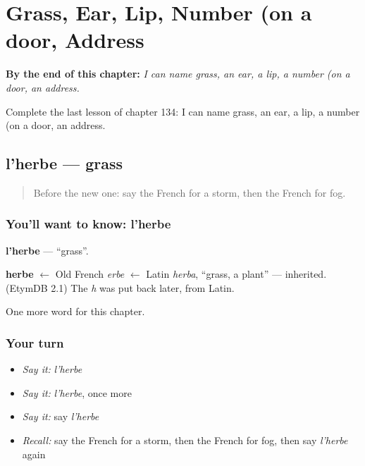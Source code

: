 
\chapter{Grass, Ear, Lip, Number (on a door, Address}
\label{ch:fr-grass-ear-lip-number-on-a-door-address}

\begin{chapteropening}
\textbf{By the end of this chapter:} \emph{I can name grass, an ear, a lip, a number (on a door, an address.}

Complete the last lesson of chapter 134: I can name grass, an ear, a lip, a number (on a door, an address.
\end{chapteropening}

\section[l'herbe]{l'herbe — grass}

\label{lesson:FR-C134-herbe}



\begin{quote}
Before the new one: say the French for a storm, then the French for fog.
\end{quote}

\subsection*{You'll want to know: l'herbe}
\textbf{l'herbe} — \textquotedblleft{}grass\textquotedblright{}.

\begin{cousinweb}
\textbf{herbe} $\leftarrow$ Old French \emph{erbe} $\leftarrow$ Latin \emph{herba}, \textquotedblleft{}grass, a plant\textquotedblright{} — inherited. (EtymDB 2.1) The \emph{h} was put back later, from Latin.
\end{cousinweb}

\begin{grammarlens}[title={What you've built}]
One more word for this chapter.
\end{grammarlens}

\subsection*{Your turn}
\begin{itemize}
\raggedright
  \item \emph{Say it:} \emph{l'herbe}
  \item \emph{Say it:} \emph{l'herbe}, once more
  \item \emph{Say it:} say \emph{l'herbe}
  \item \emph{Recall:} say the French for a storm, then the French for fog, then say \emph{l'herbe} again
\end{itemize}

